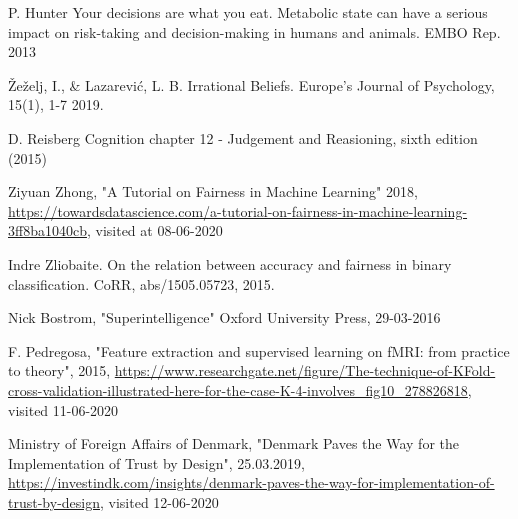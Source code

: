 \documentclass[11pt, fleqn, titlepage]{article}
\begin{document}
\begin{thebibliography}{9}
		 P. Hunter Your decisions are what you eat. Metabolic state can have a serious impact on risk-taking and decision-making in humans and animals. EMBO Rep. 2013
		
		 Žeželj, I., \& Lazarević, L. B.  Irrational Beliefs. Europe’s Journal of Psychology, 15(1), 1-7 2019.
		
		 D. Reisberg Cognition chapter 12 - Judgement and Reasioning, sixth edition (2015)
		
		 Ziyuan Zhong, "A Tutorial on Fairness in Machine Learning" 2018, \url{https://towardsdatascience.com/a-tutorial-on-fairness-in-machine-learning-3ff8ba1040cb}, visited at 08-06-2020
		
		 Indre Zliobaite. On the relation between accuracy and fairness in binary classification. CoRR, abs/1505.05723, 2015.
		
		 Nick Bostrom, "Superintelligence" Oxford University Press, 29-03-2016
		
		 F. Pedregosa, "Feature extraction and supervised learning on fMRI: from practice to theory", 2015, \url{https://www.researchgate.net/figure/The-technique-of-KFold-cross-validation-illustrated-here-for-the-case-K-4-involves_fig10_278826818}, visited 11-06-2020
		
		 Ministry of Foreign Affairs of Denmark, "Denmark Paves the Way for the Implementation of Trust by Design", 25.03.2019, \url{https://investindk.com/insights/denmark-paves-the-way-for-implementation-of-trust-by-design}, visited 12-06-2020
		
	\end{thebibliography}
	
	
	\newpage
	
	
\end{document}
